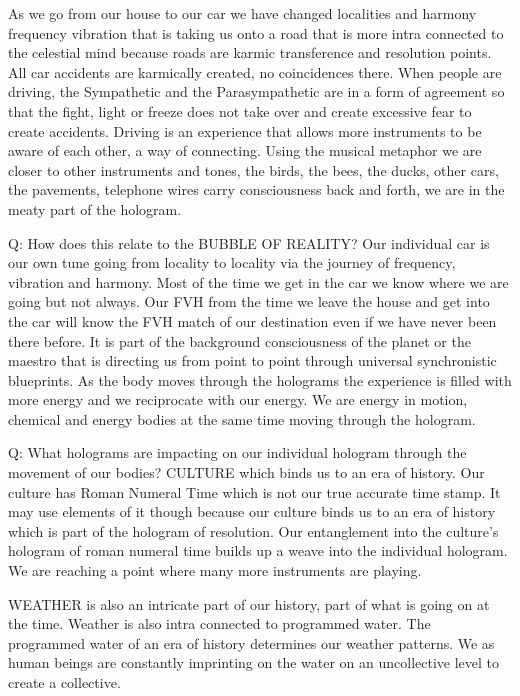 As we go from our house to our car we have changed localities and
harmony frequency vibration that is taking us onto a road that is more
intra connected to the celestial mind because roads are karmic
transference and resolution points. All car accidents are karmically
created, no coincidences there. When people are driving, the Sympathetic
and the Parasympathetic are in a form of agreement so that the fight,
light or freeze does not take over and create excessive fear to create
accidents. Driving is an experience that allows more instruments to be
aware of each other, a way of connecting. Using the musical metaphor we
are closer to other instruments and tones, the birds, the bees, the
ducks, other cars, the pavements, telephone wires carry consciousness
back and forth, we are in the meaty part of the hologram.

Q: How does this relate to the BUBBLE OF REALITY? Our individual car is
our own tune going from locality to locality via the journey of
frequency, vibration and harmony. Most of the time we get in the car we
know where we are going but not always. Our FVH from the time we leave
the house and get into the car will know the FVH match of our
destination even if we have never been there before. It is part of the
background consciousness of the planet or the maestro that is directing
us from point to point through universal synchronistic blueprints. As
the body moves through the holograms the experience is filled with more
energy and we reciprocate with our energy. We are energy in motion,
chemical and energy bodies at the same time moving through the hologram.

Q: What holograms are impacting on our individual hologram through the
movement of our bodies? CULTURE which binds us to an era of history. Our
culture has Roman Numeral Time which is not our true accurate time
stamp. It may use elements of it though because our culture binds us to
an era of history which is part of the hologram of resolution. Our
entanglement into the culture's hologram of roman numeral time builds up
a weave into the individual hologram. We are reaching a point where many
more instruments are playing.

WEATHER is also an intricate part of our history, part of what is going
on at the time. Weather is also intra connected to programmed water. The
programmed water of an era of history determines our weather patterns.
We as human beings are constantly imprinting on the water on an
uncollective level to create a collective.

